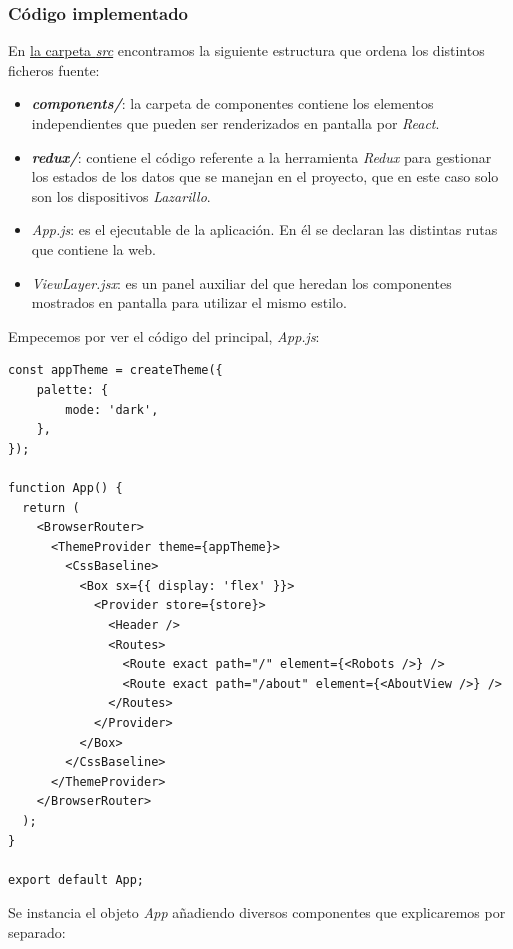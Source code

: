 \subsubsection{Código implementado}

En \href{https://github.com/adrianmorente/lazarillo-admin-frontend/tree/main/src}{la carpeta \textit{src}} encontramos la siguiente estructura que ordena los distintos ficheros fuente:

\begin{itemize}
	\item \textbf{\textit{components/}}: la carpeta de componentes contiene los elementos independientes que pueden ser renderizados en pantalla por \textit{React}.
	\item \textbf{\textit{redux/}}: contiene el código referente a la herramienta \textit{Redux} para gestionar los estados de los datos que se manejan en el proyecto, que en este caso solo son los dispositivos \textit{Lazarillo}.
	\item \textit{App.js}: es el ejecutable de la aplicación. En él se declaran las distintas rutas que contiene la web.
	\item \textit{ViewLayer.jsx}: es un panel auxiliar del que heredan los componentes mostrados en pantalla para utilizar el mismo estilo.
\end{itemize}

Empecemos por ver el código del principal, \textit{App.js}:\\

\begin{lstlisting}
const appTheme = createTheme({
	palette: {
		mode: 'dark',
	},
});

function App() {
  return (
    <BrowserRouter>
      <ThemeProvider theme={appTheme}>
        <CssBaseline>
          <Box sx={{ display: 'flex' }}>
            <Provider store={store}>
              <Header />
              <Routes>
                <Route exact path="/" element={<Robots />} />
                <Route exact path="/about" element={<AboutView />} />
              </Routes>
            </Provider>
          </Box>
        </CssBaseline>
      </ThemeProvider>
    </BrowserRouter>
  );
}

export default App;
\end{lstlisting}

Se instancia el objeto \textit{App} añadiendo diversos componentes que explicaremos por separado:


